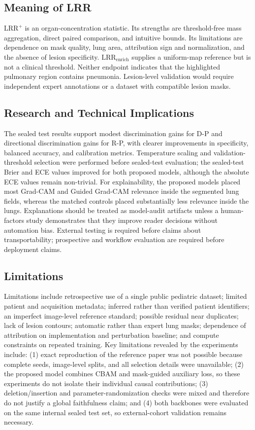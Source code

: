 \documentclass[runningheads]{llncs}
\newcommand{\lrrpos}{\mathrm{LRR}^{+}}
\newcommand{\lrrarea}{\mathrm{LRR}_{\mathrm{enrich}}}
\begin{document}
\subsection{Meaning of LRR}

$\lrrpos$ is an organ-concentration statistic. Its strengths are threshold-free mass
aggregation, direct paired comparison, and intuitive bounds. Its limitations are
dependence on mask quality, lung area, attribution sign and normalization, and the
absence of lesion specificity. $\lrrarea$ supplies a uniform-map reference but is
not a clinical threshold. Neither endpoint indicates that the highlighted pulmonary
region contains pneumonia. Lesion-level validation would require independent expert
annotations or a dataset with compatible lesion masks.

\subsection{Research and Technical Implications}

The sealed test results support modest discrimination gains for D-P and
directional discrimination gains for R-P, with clearer improvements in
specificity, balanced accuracy, and calibration metrics. Temperature scaling and
validation-threshold selection were performed before sealed-test evaluation; the
sealed-test Brier and ECE values improved for both proposed models, although the
absolute ECE values remain non-trivial. For explainability, the proposed models
placed most Grad-CAM and Guided Grad-CAM relevance inside the segmented lung
fields, whereas the matched controls placed substantially less relevance inside
the lungs.
Explanations should be treated as model-audit artifacts unless a
human-factors study demonstrates that they improve reader decisions without
automation bias. External testing is required before claims about transportability;
prospective and workflow evaluation are required before deployment claims.

\subsection{Limitations}

Limitations include retrospective use of a single public pediatric
dataset; limited patient and acquisition metadata; inferred rather than verified
patient identifiers; an imperfect image-level reference standard; possible residual
near duplicates; lack of lesion contours; automatic rather than expert lung masks;
dependence of attribution on implementation and perturbation baseline; and compute
constraints on repeated training. Key limitations revealed by the experiments
include: (1) exact reproduction of the reference paper was not possible because
complete seeds, image-level splits, and all selection details were unavailable;
(2) the proposed model combines CBAM and mask-guided auxiliary loss, so these
experiments do not isolate their individual causal contributions; (3)
deletion/insertion and parameter-randomization checks were mixed and therefore do
not justify a global faithfulness claim; and (4) both backbones were evaluated on
the same internal sealed test set, so external-cohort validation remains necessary.
\end{document}
